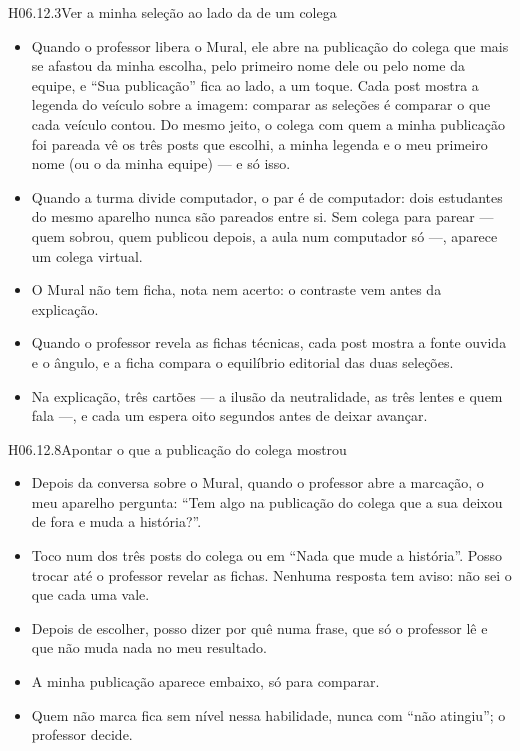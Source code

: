 \begin{historia}{H06.12.3}{Ver a minha seleção ao lado da de um colega}{\pronto}
\aceite
\begin{itemize}
  \item Quando o professor libera o Mural, ele abre na publicação do colega
    que mais se afastou da minha escolha, pelo primeiro nome dele ou pelo nome
    da equipe, e \enquote{Sua publicação} fica ao lado, a um toque. Cada post
    mostra a legenda do veículo sobre a imagem: comparar as seleções é comparar
    o que cada veículo contou. Do mesmo jeito, o colega com
    quem a minha publicação foi pareada vê os três posts que escolhi, a minha
    legenda e o meu primeiro nome (ou o da minha equipe) --- e só isso.
  \item Quando a turma divide computador, o par é de computador: dois
    estudantes do mesmo aparelho nunca são pareados entre si. Sem colega para
    parear --- quem sobrou, quem publicou depois, a aula num computador só ---,
    aparece um colega virtual.
  \item O Mural não tem ficha, nota nem acerto: o contraste vem antes da
    explicação.
  \item Quando o professor revela as fichas técnicas, cada post mostra a fonte
    ouvida e o ângulo, e a ficha compara o equilíbrio editorial das duas
    seleções.
  \item Na explicação, três cartões --- a ilusão da neutralidade, as três lentes
    e quem fala ---, e cada um espera oito segundos antes de deixar avançar.
\end{itemize}
\end{historia}

\begin{historia}{H06.12.8}{Apontar o que a publicação do colega mostrou}{\parcial}
\aceite
\begin{itemize}
  \item Depois da conversa sobre o Mural, quando o professor abre a marcação,
    o meu aparelho pergunta: \enquote{Tem algo na publicação do colega que a sua
    deixou de fora e muda a história?}.
  \item Toco num dos três posts do colega ou em \enquote{Nada que mude a
    história}. Posso trocar até o professor revelar as fichas. Nenhuma resposta
    tem aviso: não sei o que cada uma vale.
  \item Depois de escolher, posso dizer por quê numa frase, que só o professor
    lê e que não muda nada no meu resultado.
  \item A minha publicação aparece embaixo, só para comparar.
  \item Quem não marca fica sem nível nessa habilidade, nunca com \enquote{não
    atingiu}; o professor decide.
\end{itemize}
\end{historia}

